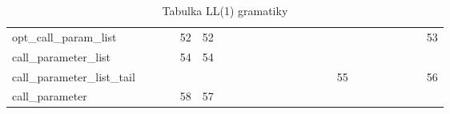 \begin{table}[htbp]
\begin{tabular}{l|ccccccccccccccccccccccc}
opt\_call\_param\_list      &                   &          &          & 52   & 52 &       &       &         &      &          &        &      &     &                    &      &     &     &       &          &          &     &       & 53      \\
call\_parameter\_list       &                   &          &          & 54   & 54 &       &       &         &      &          &        &      &     &                    &      &     &     &       &          &          &     &       &         \\
call\_parameter\_list\_tail &                   &          &          &      &    &       &       &         &      &          &        &      &     &                    &      & 55  &     &       &          &          &     &       & 56      \\
call\_parameter             &                   &          &          & 58   & 57 &       &       &         &      &          &        &      &     &                    &      &     &     &       &          &          &     &       &        \\
\bottomrule
\end{tabular}
\caption{Tabulka LL(1) gramatiky}
\end{table}
